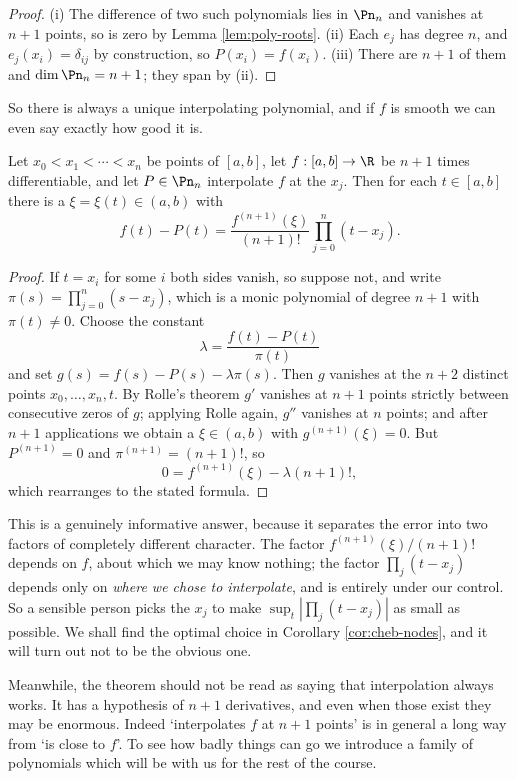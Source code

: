 \begin{proof}
	(i) The difference of two such polynomials lies in $\Pn_n$ and vanishes at $n+1$ points, so is zero by Lemma \ref{lem:poly-roots}. (ii) Each $e_j$ has degree $n$, and $e_j(x_i)=\delta_{ij}$ by construction, so $P(x_i) = f(x_i)$. (iii) There are $n+1$ of them and $\dim \Pn_n = n+1$; they span by (ii).
\end{proof}

So there is always a unique interpolating polynomial, and if $f$ is smooth we can even say exactly how good it is.

\begin{theorem}\label{thm:interp-error}
	Let $x_0<x_1<\cdots<x_n$ be points of $[a,b]$, let $f : [a,b]\to\R$ be $n+1$ times differentiable, and let $P \in\Pn_n$ interpolate $f$ at the $x_j$. Then for each $t \in[a,b]$ there is a $\xi = \xi(t) \in (a,b)$ with
	$$f(t)-P(t) = \frac{f^{(n+1)}(\xi)}{(n+1)!}\prod_{j=0}^n(t-x_j).$$
\end{theorem}

\begin{proof}
	If $t = x_i$ for some $i$ both sides vanish, so suppose not, and write $\pi(s) = \prod_{j=0}^n(s-x_j)$, which is a monic polynomial of degree $n+1$ with $\pi(t)\neq0$. Choose the constant
	$$\lambda = \frac{f(t)-P(t)}{\pi(t)}$$
	and set $g(s) = f(s)-P(s)-\lambda\pi(s)$. Then $g$ vanishes at the $n+2$ distinct points $x_0,\ldots,x_n,t$. By Rolle's theorem $g'$ vanishes at $n+1$ points strictly between consecutive zeros of $g$; applying Rolle again, $g''$ vanishes at $n$ points; and after $n+1$ applications we obtain a $\xi\in(a,b)$ with $g^{(n+1)}(\xi)=0$. But $P^{(n+1)} = 0$ and $\pi^{(n+1)} = (n+1)!$, so
	$$0 = f^{(n+1)}(\xi)-\lambda(n+1)!,$$
	which rearranges to the stated formula.
\end{proof}

This is a genuinely informative answer, because it separates the error into two factors of completely different character. The factor $f^{(n+1)}(\xi)/(n+1)!$ depends on $f$, about which we may know nothing; the factor $\prod_j(t-x_j)$ depends only on \emph{where we chose to interpolate}, and is entirely under our control. So a sensible person picks the $x_j$ to make $\sup_t\left|\prod_j(t-x_j)\right|$ as small as possible. We shall find the optimal choice in Corollary \ref{cor:cheb-nodes}, and it will turn out not to be the obvious one.

Meanwhile, the theorem should not be read as saying that interpolation always works. It has a hypothesis of $n+1$ derivatives, and even when those exist they may be enormous. Indeed `interpolates $f$ at $n+1$ points' is in general a long way from `is close to $f$'. To see how badly things can go we introduce a family of polynomials which will be with us for the rest of the course.


